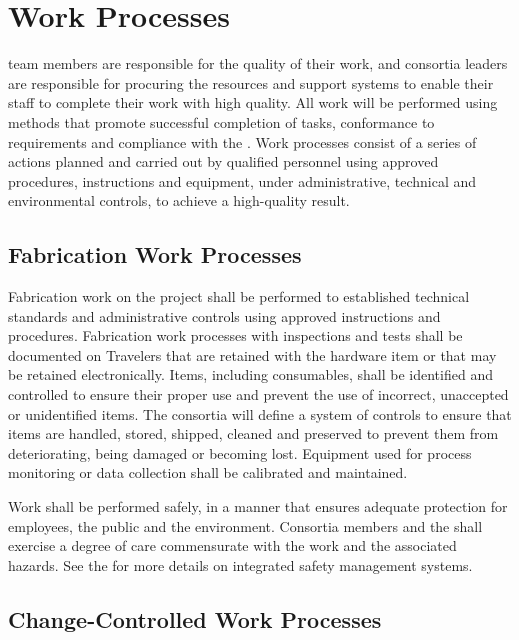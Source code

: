\section{Work Processes}

 team members are responsible for the quality of their
work, and consortia leaders are responsible for procuring the
resources and support systems to enable their staff to complete their
work with high quality. All  work will be performed using
methods that promote successful completion of tasks, conformance to
 requirements and compliance with the
 . Work processes consist of a
series of actions planned and carried out by qualified personnel using
approved procedures, instructions and equipment, under administrative,
technical and environmental controls, to achieve a high-quality
result.

\subsection{Fabrication Work Processes}

Fabrication work on the  project shall be performed to
established technical standards and administrative controls using
approved instructions and procedures. Fabrication work processes with
 inspections and tests shall be documented on Travelers that
are retained with the hardware item or that may be retained
electronically. Items, including consumables, shall be identified and
controlled to ensure their proper use and prevent the use of
incorrect, unaccepted or unidentified items. The consortia will define
a system of controls to ensure that items are handled, stored,
shipped, cleaned and preserved to prevent them from deteriorating,
being damaged or becoming lost. Equipment used for process monitoring
or data collection shall be calibrated and maintained.

Work shall be performed safely, in a manner that ensures adequate
protection for employees, the public and the environment. Consortia
members and the   shall exercise a degree of
care commensurate with the work and the associated hazards. See the
  for more details on
 integrated safety management systems.

\subsection{Change-Controlled Work Processes}
\label{sec:change-control}

